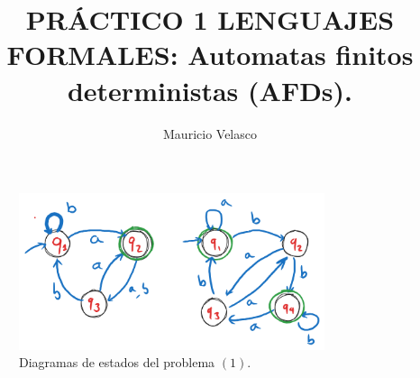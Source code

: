\documentclass[12pt, a4paper]{article}
\date{}
\begin{document}
\title{PRÁCTICO 1 LENGUAJES FORMALES: Automatas finitos deterministas (AFDs).}
\author{Mauricio Velasco}
\maketitle{}

\begin{center}
\begin{figure}
\label{Fig}
\caption{Diagramas de estados del problema $(1)$.}
\includegraphics[width=0.8\textwidth]{ADF_1.png}
\end{figure}
\end{center}
\end{document}

